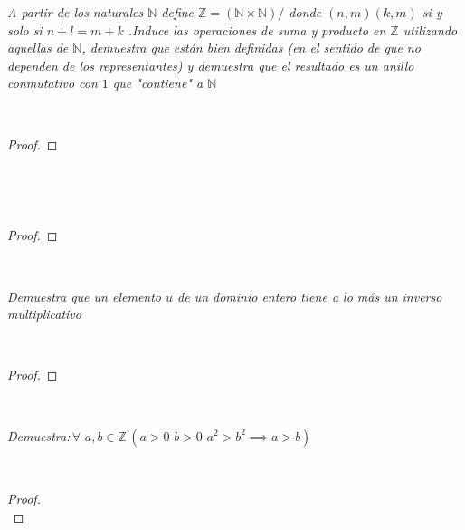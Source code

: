 \documentclass[11pt,letterpaper]{article}
\newcommand{\N}{\mathbb{N}}
\newcommand{\Z}{\mathbb{Z}}
\begin{document}
\begin{tcolorbox}[
	title = \textcolor{black}{\textcolor{white}{Problema 1}},]
\textit{A partir de los naturales $\N$ define $\Z=(\N\times \N)/$ donde $(n,m) (k,m)$ si y solo si $n+l=m+k$
.Induce las operaciones de suma y producto en $\Z$ utilizando aquellas de $\N$, demuestra que est\'an bien definidas 
(en el sentido de que no dependen de los representantes) y demuestra que el resultado es un anillo conmutativo con $1$ que 
"contiene" a $\N$ 
}
\end{tcolorbox}\,\\
\begin{proof}
    
\end{proof}\,\\
\,\\
\begin{proof}
    
\end{proof}\,\\
\begin{tcolorbox}[
	title = \textcolor{black}{\textcolor{white}{Problema 3}},]
\textit{Demuestra que un elemento $u$ de un dominio entero tiene a lo m\'as un inverso multiplicativo
}
\end{tcolorbox}\,\\
\begin{proof}
    
\end{proof}\,\\
\begin{tcolorbox}[
	title = \textcolor{black}{\textcolor{white}{Problema 4}},]
\textit{Demuestra:\,$\forall\,\,a,b\in \Z\,(a>0\,\,b>0\,\,a^2>b^2 \implies a>b)$
}
\end{tcolorbox}\,\\
\begin{proof}\,\\

    
\end{proof}\,\\
\end{document}
